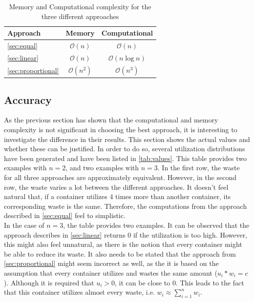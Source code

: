 \begin{table}[ht]
    \centering
    \begin{tabular}{l|c|c}
        \textbf{Approach} & \textbf{Memory} & \textbf{Computational} \\ \hline
        \ref{sec:equal} & $\mathcal{O}(n)$ & $\mathcal{O}(n)$ \\
        \ref{sec:linear} & $\mathcal{O}(n)$ & $\mathcal{O}(n \log n)$ \\
        \ref{sec:proportional} & $\mathcal{O}(n^2)$ & $\mathcal{O}(n^3)$ \\
    \end{tabular}
    \caption{Memory and Computational complexity for the three different approaches}
    \label{tab:complexity}
\end{table}

\subsection{Accuracy} \label{sec:data}
As the previous section has shown that the computational and memory complexity is not significant in choosing the best approach, it is interesting to investigate the difference in their results. This section shows the actual values and whether these can be justified. In order to do so, several utilization distributions have been generated and have been listed in \autoref{tab:values}. This table provides two examples with $n = 2$, and two examples with $n = 3$. In the first row, the waste for all three approaches are approximately equivalent. However, in the second row, the waste varies a lot between the different approaches. It doesn't feel natural that, if a container utilizes 4 times more than another container, its corresponding waste is the same. Therefore, the computations from the approach described in \autoref{sec:equal} feel to simplistic.\\

\noindent
In the case of $n = 3$, the table provides two examples. It can be observed that the approach describes in \autoref{sec:linear} returns $0$ if the utilization is too high. However, this might also feel unnatural, as there is the notion that every container might be able to reduce its waste. It also needs to be stated that the approach from \autoref{sec:proportional} might seem incorrect as well, as the it is based on the assumption that every container utilizes and wastes the same amount ($u_i * w_i = c$). Although it is required that $u_i > 0$, it can be close to $0$. This leads to the fact that this container utilizes almost every waste, i.e. $w_i \approx \sum_{i=1}^n w_i$.\\

